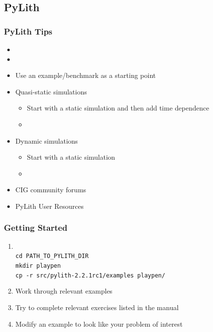 \documentclass[aspectratio=169]{beamer}
\begin{document}
\subsection{PyLith}

\begin{frame}
  \frametitle{PyLith Tips}
  \summary{}
 
  \begin{itemize}
  \item {}
  \item {}
  \item Use an example/benchmark as a starting point
  \item Quasi-static simulations
    \begin{itemize}
    \item Start with a static simulation and then add time dependence
    \item {}
    \end{itemize}
  \item Dynamic simulations
    \begin{itemize}
    \item Start with a static simulation
    \item {}
    \end{itemize}
  \item CIG community forums\\
    {\tt {}}
  \item PyLith User Resources\\
    {\small\tt {}}
  \end{itemize}

\end{frame}


\begin{frame}
  \frametitle{Getting Started}
  \summary{}

  \begin{enumerate}
  \item {}\\
    {\tt cd PATH\_TO\_PYLITH\_DIR} \\
    {\tt mkdir playpen} \\
    {\tt cp -r src/pylith-2.2.1rc1/examples playpen/}
  \item Work through relevant examples
  \item Try to complete relevant exercises listed in the manual
  \item Modify an example to look like your problem of interest
  \end{enumerate}

\end{frame}
\end{document}
